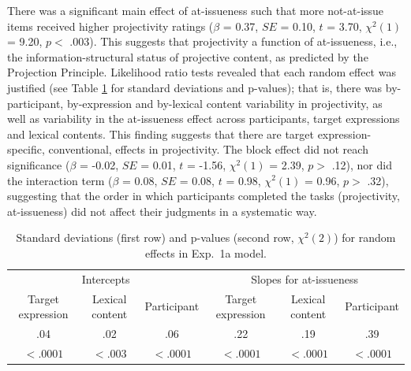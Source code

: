 \documentclass[11pt,fleqn]{article}
\newcommand{\6}{\mbox{$[\hspace*{-.6mm}[$}}
\newcommand{\9}{\mbox{$]\hspace*{-.6mm}]$}}
\newcommand{\tableref}[1]{Table \ref{#1}}
\begin{document}
There was a significant main effect of at-issueness such that more not-at-issue items received higher projectivity ratings ($\beta$ = 0.37, $SE$ = 0.10, $t$ = 3.70, $\chi^2(1)$ = 9.20, $p <$ .003). This suggests that projectivity a function of at-issueness, i.e., the information-structural status of projective content, as predicted by the Projection Principle. Likelihood ratio tests revealed that each random effect was justified (see \tableref{tab:random1a} for standard deviations and p-values); that is, there was by-participant, by-expression and by-lexical content variability in projectivity, as well as variability in the at-issueness effect across participants, target expressions and lexical contents. This finding suggests that there are target expression-specific, conventional, effects in projectivity. The block effect did not reach significance ($\beta$ = -0.02, $SE$ = 0.01, $t$ = -1.56, $\chi^2(1)$ = 2.39, $p >$ .12), nor did the interaction term ($\beta$ = 0.08, $SE$ = 0.08, $t$ = 0.98, $\chi^2(1)$ = 0.96, $p >$ .32), suggesting that the order in which participants completed the tasks (projectivity, at-issueness) did not affect their judgments in a systematic way. 


\begin{table}
\begin{tabular}{c c c c c c }
\toprule
\multicolumn{3}{c}{Intercepts} & \multicolumn{3}{c}{Slopes for at-issueness}\\
Target expression & Lexical content & Participant & Target expression & Lexical content & Participant\\
\midrule
.04 & .02 & .06 & .22 & .19 & .39\\
$< .0001$ & $< .003$ & $< .0001$ & $< .0001$ & $< .0001$ & $< .0001$ \\
\bottomrule
\end{tabular}
\caption{Standard deviations (first row) and p-values (second row, $\chi^2(2)$) for random effects in Exp.~1a model.}\label{tab:random1a}
\end{table}
\end{document}

